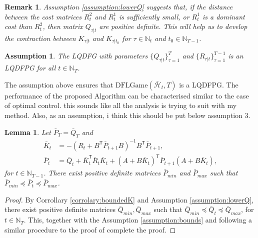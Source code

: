\documentclass[letterpaper, 10 pt, conference]{ieeeconf}  %
\newcommand{\transpose}{\mathsf{T}}
\newtheorem{lemma}{Lemma}
\newtheorem{assumption}{Assumption}
\newtheorem{remark}{Remark}
\begin{document}
\begin{remark}
    Assumption \ref{assumption:lowerQ} suggests that, if the distance between the cost matrices $R_{t}^{2}$ and $R_{t}^{1}$ is sufficiently small, or $R_{t}^{1}$ is a dominant cost than $R_{t}^{2}$, then matrix $Q_{\tau|t}$ are positive definite. This will help us to develop the contraction between $K_{\tau|t}$ and $K_{\tau|t_{0}}$ for $\tau \in \mathbb{N}_t$ and $t_{0} \in \mathbb{N}_{T-1}$.
\end{remark}
\begin{assumption}\label{assumption:potentialRepeat}
    The LQDFG with parameters $\{Q_{\tau|t}\}_{\tau=1}^{T}$ and $\{R_{\tau|t}\}_{\tau=1}^{T-1}$ is an LQDFPG for all $t\in \mathbb{N}_{T}$.
\end{assumption}
The assumption above ensures that $\text{DFLGame}(\bar{\mathcal{H}}_{t},T)$ is a LQDFPG. The performance of the proposed Algorithm can be characterised similar to the case of optimal control. {\color{red} this sounds like all the analysis is trying to suit with my method. Also, as an assumption, i think this should be put below assumption 3.}
\begin{lemma}\label{lemma:boundedP}
Let $\bar{P}_{T} = \bar{Q}_{T}$ and 
    \begin{align*}
        \bar{K}_{t}& = -(R_{t}+ B^{\transpose}\bar{P}_{t+1}B)^{-1}B^{\transpose}\bar{P}_{t+1},\\
        \bar{P}_{t}& = \bar{Q}_{t} + \bar{K}_{t}^{\transpose}\bar{R}_{t}\bar{K}_{t} + (A+B\bar{K}_{t})^{\transpose}\bar{P}_{t+1}(A+B\bar{K}_{t}),
    \end{align*}
    for $t \in \mathbb{N}_{T-1}$. There exist positive definite matrices $\bar{P}_{min}$ and $\bar{P}_{max}$ such that $
        \bar{P}_{min} \preceq \bar{P}_{t} \preceq \bar{P}_{max}$.
\end{lemma}
\begin{proof}
    By Corrollary \ref{corrolary:boundedK} and Assumption \ref{assumption:lowerQ}, there exist positive definite matrices $\bar{Q}_{min},\bar{Q}_{max}$ such that $
        \bar{Q}_{min} \preceq \bar{Q}_{t} \preceq \bar{Q}_{max}$,
    for $t\in\mathbb{N}_{T}$.
    This, together with the Assumption \ref{assumption:bounds} and following a similar procedure to the proof of \cite[Proposition 11]{zhang_regret_2021} complete the proof.
\end{proof}
\end{document}
